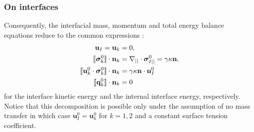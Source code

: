 \subsubsection{On interfaces}

Consequently, the interfacial mass, momentum and total energy balance equations reduce to the common expressions :
\begin{align}
    \label{eq:dt_rho_I}
    \textbf{u}_I = \textbf{u}_k
    &=0, \\
    \llbracket \bm{\sigma}_k^0 \rrbracket \cdot \textbf{n}_k 
    &=
    \mathbf{\nabla}_{||}\cdot\bm\sigma^0_{I||}
    =
    \gamma\kappa\textbf{n},
    \label{eq:surface_tension}\\
    \label{eq:dt_rhoI_uI2}
    \llbracket \textbf{u}_k^0 \cdot \bm{\sigma}_k^0 \rrbracket \cdot \textbf{n}_k
    &=
     \gamma\kappa\textbf{n}\cdot \textbf{u}_{I}^0\\
    \label{eq:dt_rhoIe_I}
    \llbracket  \textbf{q}_k^0 \rrbracket \cdot \textbf{n}_k
    &= 
     0
\end{align}
for the interface kinetic energy and the internal interface energy, respectively. 
Notice that this decomposition is possible only under the assumption of no mass transfer in which case $\textbf{u}_I^0=\textbf{u}_k^0$ for $k =1,2$ and a constant surface tension coefficient.

